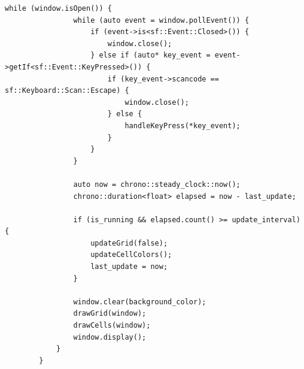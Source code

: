 \documentclass[14pt,a4paper]{extarticle}
\theoremstyle{plain}
\begin{document}
\begin{lstlisting}[title=base.cpp, gobble=16, breaklines=true, showspaces=false, showtabs=false, breakatwhitespace=true]
			while (window.isOpen()) {
				while (auto event = window.pollEvent()) {
					if (event->is<sf::Event::Closed>()) {
						window.close();
					} else if (auto* key_event = event->getIf<sf::Event::KeyPressed>()) {
						if (key_event->scancode == sf::Keyboard::Scan::Escape) {
							window.close();
						} else {
							handleKeyPress(*key_event);
						}
					}
				}
				
				auto now = chrono::steady_clock::now();
				chrono::duration<float> elapsed = now - last_update;
				
				if (is_running && elapsed.count() >= update_interval) {
					updateGrid(false);
					updateCellColors();
					last_update = now;
				}
				
				window.clear(background_color);
				drawGrid(window);
				drawCells(window);
				window.display();
			}
		}
	\end{lstlisting}
	
\end{document}
